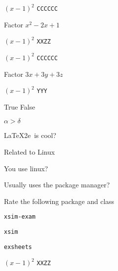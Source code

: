 \documentclass{article}
\begin{document}
    \begin{scontents}[store-env=simplews]
    $\left(x-1\right)^{2}$ \verb+CCCCCC+
    \end{scontents}


\begin{enumext}[save-ans=simplews,columns=2,align=left,check-ans=true,show-ans=true,nosep,save-ref=true,wrap-label={\tikz[scale=0.25]\duck[signpost=\scalebox{0.6}{#1}];}]
  \item Factor $x^{2}-2x+1$
    \begin{anskey*}
    $\left(x-1\right)^{2}$ \verb+XXZZ+
    \end{anskey*}

            \begin{scontents}[store-env=simple,print-env=true]
          $\left(x-1\right)^{2}$ \verb+CCCCCC+
        \end{scontents}

  \item Factor $3x+3y+3z$
    \begin{anskey*}
    $\left(x-1\right)^{2}$ \verb+YYY+
    \end{anskey*}
  \item True False
    \begin{enumext}[nosep]
      \item $\alpha > \delta$ 
      \item \LaTeX2e\ is cool? 
    \end{enumext}
  \item Related to Linux
    \begin{enumext}[nosep]
      \item You use linux? 
      \item Usually uses the package manager? 
      \item Rate the following package and class
        \begin{enumext}[nosep]
          \item \texttt{xsim-exam} 
          \item \texttt{xsim} 
          \item \texttt{exsheets}
          \begin{anskey*}
    $\left(x-1\right)^{2}$ \verb+XXZZ+
    \end{anskey*}
        \end{enumext}
    \end{enumext}
\end{enumext}
\end{document}
